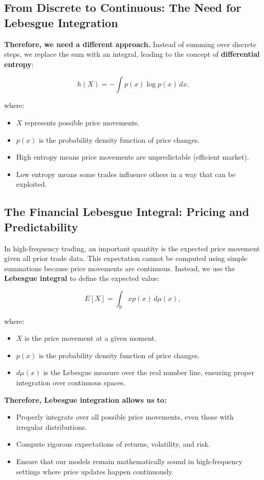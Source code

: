 \subsection{From Discrete to Continuous: The Need for Lebesgue Integration}

\textbf{Therefore, we need a different approach.} Instead of summing over discrete steps, we replace the sum with an integral, leading to the concept of \textbf{differential entropy}:

\[
h(X) = -\int p(x) \log p(x) \, dx.
\]

where:
\begin{itemize}
    \item \( X \) represents possible price movements.
    \item \( p(x) \) is the probability density function of price changes.
    \item High entropy means price movements are unpredictable (efficient market).
    \item Low entropy means some trades influence others in a way that can be exploited.
\end{itemize}

\subsection{The Financial Lebesgue Integral: Pricing and Predictability}

In high-frequency trading, an important quantity is the expected price movement given all prior trade data. This expectation cannot be computed using simple summations because price movements are continuous. Instead, we use the \textbf{Lebesgue integral} to define the expected value:

\[
E[X] = \int_{\mathbb{R}} x p(x) \, d\mu(x),
\]

where:
\begin{itemize}
    \item \( X \) is the price movement at a given moment.
    \item \( p(x) \) is the probability density function of price changes.
    \item \( d\mu(x) \) is the Lebesgue measure over the real number line, ensuring proper integration over continuous spaces.
\end{itemize}

\textbf{Therefore, Lebesgue integration allows us to:}
\begin{itemize}
    \item Properly integrate over all possible price movements, even those with irregular distributions.
    \item Compute rigorous expectations of returns, volatility, and risk.
    \item Ensure that our models remain mathematically sound in high-frequency settings where price updates happen continuously.
\end{itemize}

